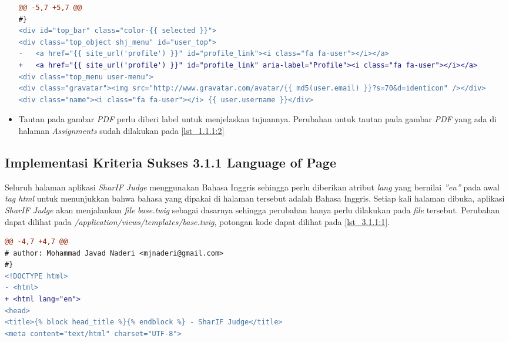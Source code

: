 \begin{itemize}
\begin{lstlisting}[language=diff, caption=Perubahan pada \textit{file} \textit{top\_bar.twig}, label=lst_2.4.4:2, basicstyle=\ttfamily, frame=single,
columns=fullflexible, keepspaces=true, breaklines=true]
@@ -5,7 +5,7 @@
#}
<div id="top_bar" class="color-{{ selected }}">
<div class="top_object shj_menu" id="user_top">
- 	<a href="{{ site_url('profile') }}" id="profile_link"><i class="fa fa-user"></i></a>
+ 	<a href="{{ site_url('profile') }}" id="profile_link" aria-label="Profile"><i class="fa fa-user"></i></a>
<div class="top_menu user-menu">
<div class="gravatar"><img src="http://www.gravatar.com/avatar/{{ md5(user.email) }}?s=70&d=identicon" /></div>
<div class="name"><i class="fa fa-user"></i> {{ user.username }}</div>
\end{lstlisting}

	\item Tautan pada gambar \textit{PDF} perlu diberi label untuk menjelaskan tujuannya. Perubahan untuk tautan pada gambar \textit{PDF} yang ada di halaman \textit{Assignments} sudah dilakukan pada \ref{lst_1.1.1:2}
\end{itemize}

\subsection{Implementasi Kriteria Sukses 3.1.1 Language of Page}
\label{subsec:implementasi_A_3.1.1}

Seluruh halaman aplikasi \textit{SharIF Judge} menggunakan Bahasa Inggris sehingga perlu diberikan atribut \textit{lang} yang bernilai \textit{''en''} pada awal \textit{tag html} untuk menunjukkan bahwa bahasa yang dipakai di halaman tersebut adalah Bahasa Inggris. Setiap kali halaman dibuka, aplikasi \textit{SharIF Judge} akan menjalankan \textit{file} \textit{base.twig} sebagai dasarnya sehingga perubahan hanya perlu dilakukan pada \textit{file} tersebut. Perubahan dapat dilihat pada \textit{/application/views/templates/base.twig}, potongan kode dapat dilihat pada \ref{lst_3.1.1:1}.

\begin{lstlisting}[language=diff, caption=Perubahan pada \textit{file} \textit{base.twig}, label=lst_3.1.1:1, basicstyle=\ttfamily, frame=single,
columns=fullflexible, keepspaces=true, breaklines=true]
@@ -4,7 +4,7 @@
# author: Mohammad Javad Naderi <mjnaderi@gmail.com>
#}
<!DOCTYPE html>
- <html>
+ <html lang="en">
<head>
<title>{% block head_title %}{% endblock %} - SharIF Judge</title>
<meta content="text/html" charset="UTF-8">
\end{lstlisting}


